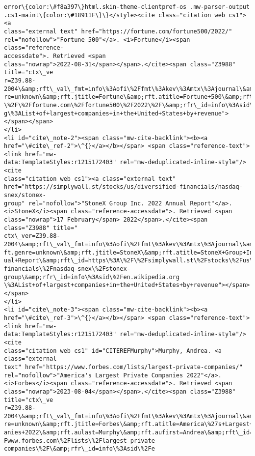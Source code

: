 \documentclass[11pt]{article}
\begin{document}
\begin{Verbatim}[commandchars=\\\{\}]
error\{color:\#f8a397\}html.skin-theme-clientpref-os .mw-parser-output
.cs1-maint\{color:\#18911F\}\}</style><cite class="citation web cs1"><a
class="external text" href="https://fortune.com/fortune500/2022/"
rel="nofollow">"Fortune 500"</a>. <i>Fortune</i><span class="reference-
accessdate">. Retrieved <span
class="nowrap">2022-08-31</span></span>.</cite><span class="Z3988" title="ctx\_ve
r=Z39.88-2004\&amp;rft\_val\_fmt=info\%3Aofi\%2Ffmt\%3Akev\%3Amtx\%3Ajournal\&amp;rft.gen
re=unknown\&amp;rft.jtitle=Fortune\&amp;rft.atitle=Fortune+500\&amp;rft\_id=https\%3A
\%2F\%2Ffortune.com\%2Ffortune500\%2F2022\%2F\&amp;rfr\_id=info\%3Asid\%2Fen.wikipedia.or
g\%3AList+of+largest+companies+in+the+United+States+by+revenue"></span></span>
</li>
<li id="cite\_note-2"><span class="mw-cite-backlink"><b><a
href="\#cite\_ref-2">\^{}</a></b></span> <span class="reference-text"><link href="mw-
data:TemplateStyles:r1215172403" rel="mw-deduplicated-inline-style"/><cite
class="citation web cs1"><a class="external text"
href="https://simplywall.st/stocks/us/diversified-financials/nasdaq-snex/stonex-
group" rel="nofollow">"StoneX Group Inc. 2022 Annual Report"</a>.
<i>StoneX</i><span class="reference-accessdate">. Retrieved <span
class="nowrap">17 February</span> 2022</span>.</cite><span class="Z3988" title="
ctx\_ver=Z39.88-2004\&amp;rft\_val\_fmt=info\%3Aofi\%2Ffmt\%3Akev\%3Amtx\%3Ajournal\&amp;r
ft.genre=unknown\&amp;rft.jtitle=StoneX\&amp;rft.atitle=StoneX+Group+Inc.+2022+Ann
ual+Report\&amp;rft\_id=https\%3A\%2F\%2Fsimplywall.st\%2Fstocks\%2Fus\%2Fdiversified-
financials\%2Fnasdaq-snex\%2Fstonex-group\&amp;rfr\_id=info\%3Asid\%2Fen.wikipedia.org
\%3AList+of+largest+companies+in+the+United+States+by+revenue"></span></span>
</li>
<li id="cite\_note-3"><span class="mw-cite-backlink"><b><a
href="\#cite\_ref-3">\^{}</a></b></span> <span class="reference-text"><link href="mw-
data:TemplateStyles:r1215172403" rel="mw-deduplicated-inline-style"/><cite
class="citation web cs1" id="CITEREFMurphy">Murphy, Andrea. <a class="external
text" href="https://www.forbes.com/lists/largest-private-companies/"
rel="nofollow">"America's Largest Private Companies 2022"</a>.
<i>Forbes</i><span class="reference-accessdate">. Retrieved <span
class="nowrap">2023-08-04</span></span>.</cite><span class="Z3988" title="ctx\_ve
r=Z39.88-2004\&amp;rft\_val\_fmt=info\%3Aofi\%2Ffmt\%3Akev\%3Amtx\%3Ajournal\&amp;rft.gen
re=unknown\&amp;rft.jtitle=Forbes\&amp;rft.atitle=America\%27s+Largest+Private+Comp
anies+2022\&amp;rft.aulast=Murphy\&amp;rft.aufirst=Andrea\&amp;rft\_id=https\%3A\%2F\%2
Fwww.forbes.com\%2Flists\%2Flargest-private-companies\%2F\&amp;rfr\_id=info\%3Asid\%2Fe

\end{Verbatim}
\end{document}
